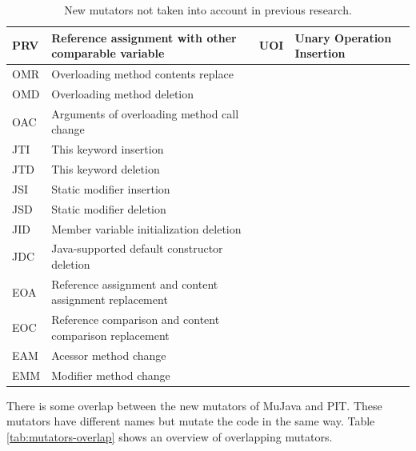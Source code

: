 \documentclass[conference,draftclsnofoot,onecolumn]{IEEEtran}
\begin{document}
\begin{table}[ht]
\begin{tabular}{|l|l|l|l|}
PRV & Reference assignment   with other comparable variable     & UOI                   & Unary Operation Insertion       \\ \hline
OMR & Overloading method   contents replace                     & \multicolumn{1}{l|}{} &                                 \\ \hline
OMD & Overloading method   deletion                             & \multicolumn{1}{l|}{} &                                 \\ \hline
OAC & Arguments of   overloading method call change             & \multicolumn{1}{l|}{} &                                 \\ \hline
JTI & This keyword insertion                                    & \multicolumn{1}{l|}{} &                                 \\ \hline
JTD & This keyword deletion                                     & \multicolumn{1}{l|}{} &                                 \\ \hline
JSI & Static modifier   insertion                               & \multicolumn{1}{l|}{} &                                 \\ \hline
JSD & Static modifier   deletion                                & \multicolumn{1}{l|}{} &                                 \\ \hline
JID & Member variable   initialization deletion                 & \multicolumn{1}{l|}{} &                                 \\ \hline
JDC & Java-supported default   constructor deletion             & \multicolumn{1}{l|}{} &                                 \\ \hline
EOA & Reference assignment   and content assignment replacement & \multicolumn{1}{l|}{} &                                 \\ \hline
EOC & Reference comparison   and content comparison replacement & \multicolumn{1}{l|}{} &                                 \\ \hline
EAM & Acessor method change                                     & \multicolumn{1}{l|}{} &                                 \\ \hline
EMM & Modifier method change                                    & \multicolumn{1}{l|}{} &                                 \\ \hline
\end{tabular}
\caption{\label{tab:mutators-current}New mutators not taken into account in previous research.}
\end{table}
There is some overlap between the new mutators of MuJava and PIT. These mutators have different names but mutate the code in the same way. Table \ref{tab:mutators-overlap} shows an overview of overlapping mutators.
\end{document}
